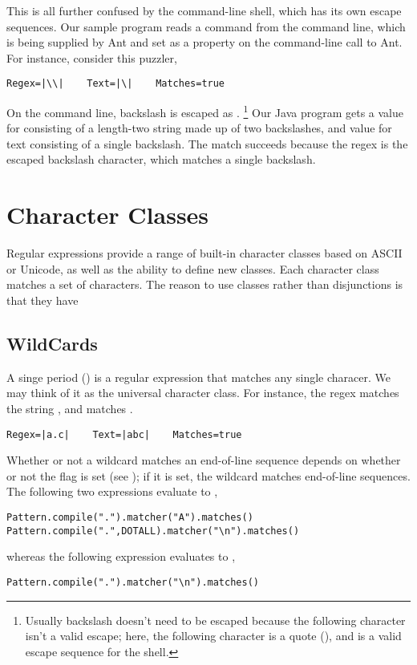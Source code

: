 This is all further confused by the command-line shell, which has its
own escape sequences.  Our sample program reads a command from the
command line, which is being supplied by Ant and set as a property on
the command-line call to Ant.  For instance, consider this puzzler,
%
%
\begin{verbatim}
Regex=|\\|    Text=|\|    Matches=true
\end{verbatim}
%
On the command line, backslash is escaped as \code{\bk\bk}.%
%
\footnote{Usually backslash doesn't need to be escaped because the
following character isn't a valid escape; here, the following
character is a quote (), and  is a valid escape
sequence for the shell.}
%
Our Java program gets a value for  consisting of a
length-two string made up of two backslashes, and value for text
consisting of a single backslash.  The match succeeds because the
regex \code{\bk\bk} is the escaped backslash character, which matches
a single backslash.


\section{Character Classes}

Regular expressions provide a range of built-in character classes
based on ASCII or Unicode, as well as the ability to define new
classes.  Each character class matches a set of characters.  The
reason to use classes rather than disjunctions is that they have


\subsection{WildCards}\label{section:regex-wildcard}

A singe period () is a regular expression that matches any
single characer.  We may think of it as the universal character class.
For instance, the regex  matches the string ,
and  matches .%
%
\begin{verbatim}
Regex=|a.c|    Text=|abc|    Matches=true
\end{verbatim}
%

Whether or not a wildcard matches an end-of-line sequence depends on
whether or not the  flag is set (see
); if it is set, the wildcard matches
end-of-line sequences.  The following two expressions evaluate to
,
%
\begin{verbatim}
Pattern.compile(".").matcher("A").matches()
Pattern.compile(".",DOTALL).matcher("\n").matches()
\end{verbatim}
%
whereas the following expression evaluates to ,
%
\begin{verbatim}
Pattern.compile(".").matcher("\n").matches()
\end{verbatim}

